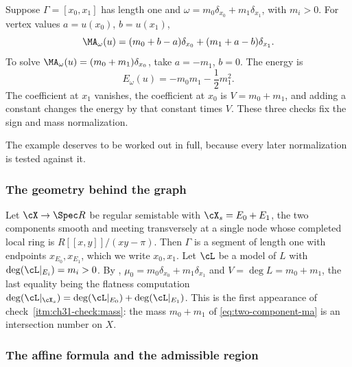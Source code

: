 \begin{example}
\label{ex:two-component-complete}
Suppose $\Gamma=[x_0,x_1]$ has length one and
$\omega=m_0\delta_{x_0}+m_1\delta_{x_1}$, with $m_i>0$.  For vertex
values $a=u(x_0)$, $b=u(x_1)$,
\begin{equation}
 \MA_\omega(u)
 =(m_0+b-a)\delta_{x_0}+(m_1+a-b)\delta_{x_1}.
\label{eq:two-component-ma}
\end{equation}
To solve $\MA_\omega(u)=(m_0+m_1)\delta_{x_0}$, take
$a=-m_1$, $b=0$.  The energy is
\begin{equation}
 E_\omega(u)
 =-m_0m_1-\frac12m_1^2.
\label{eq:two-component-energy}
\end{equation}
The coefficient at $x_1$ vanishes, the coefficient at $x_0$ is
$V=m_0+m_1$, and adding a constant changes the energy by that constant
times $V$.  These three checks fix the sign and mass normalization.
\end{example}

The example deserves to be worked out in full, because every later
normalization is tested against it.

\subsubsection*{The geometry behind the graph}

Let $\cX\to\Spec R$ be regular semistable with
$\cX_s=E_0+E_1$, the two components smooth and meeting transversely at a
single node whose completed local ring is $R[[x,y]]/(xy-\pi)$.  Then
$\Gamma$ is a segment of length one with endpoints $x_{E_0},x_{E_1}$,
which we write $x_0,x_1$.  Let $\cL$ be a model of $L$ with
$\deg(\cL|_{E_i})=m_i>0$.  By ,
$\mu_0=m_0\delta_{x_0}+m_1\delta_{x_1}$ and
$V=\deg L=m_0+m_1$, the last equality being the flatness computation
$\deg(\cL|_{\cX_s})=\deg(\cL|_{E_0})+\deg(\cL|_{E_1})$.  This is the
first appearance of check~\cref{itm:ch31-check:mass}: the mass $m_0+m_1$
of \eqref{eq:two-component-ma} is an intersection number on $X$.

\subsubsection*{The affine formula and the admissible region}


